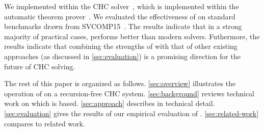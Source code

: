 We implemented \sys within the \duality CHC solver~\cite{bjorner13},
which is implemented within the \zthree automatic theorem
prover~\cite{moura08}.
%
We evaluated the effectiveness of \sys on standard benchmarks drawn
from SVCOMP15~\cite{svcomp15}.
%
The results indicate that in a strong majority of practical cases,
\sys performs better than modern solvers.
%
Futhermore, the results indicate that combining the strengths of \sys
with that of other existing approaches (as discussed in
\autoref{sec:evaluation}) is a promising direction for the future of
CHC solving.

The rest of this paper is organized as follows.
%
\autoref{sec:overview} illustrates the operation of \sys on a
recursion-free CHC system.
%
\autoref{sec:background} reviews technical work on which \sys is
based.
%
\autoref{sec:approach} describes \sys in technical detail.
%
\autoref{sec:evaluation} gives the results of our empirical evaluation
of \sys.
%
\autoref{sec:related-work} compares \sys to related work.

